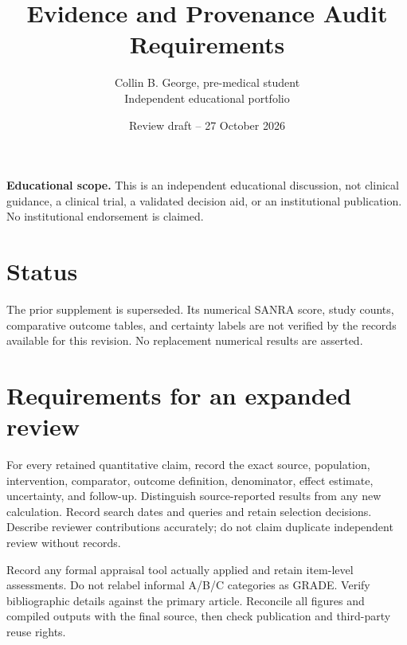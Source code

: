 \documentclass[11pt]{article}
\title{Evidence and Provenance Audit Requirements}
\author{Collin B. George, pre-medical student\\Independent educational portfolio}
\date{Review draft -- 27 October 2026}
\begin{document}
\maketitle
\noindent\textbf{Educational scope.} This is an independent educational discussion, not clinical guidance, a clinical trial, a validated decision aid, or an institutional publication. No institutional endorsement is claimed.

\section{Status}
The prior supplement is superseded. Its numerical SANRA score, study counts, comparative outcome tables, and certainty labels are not verified by the records available for this revision. No replacement numerical results are asserted.
\section{Requirements for an expanded review}
For every retained quantitative claim, record the exact source, population, intervention, comparator, outcome definition, denominator, effect estimate, uncertainty, and follow-up. Distinguish source-reported results from any new calculation. Record search dates and queries and retain selection decisions. Describe reviewer contributions accurately; do not claim duplicate independent review without records.

Record any formal appraisal tool actually applied and retain item-level assessments. Do not relabel informal A/B/C categories as GRADE. Verify bibliographic details against the primary article. Reconcile all figures and compiled outputs with the final source, then check publication and third-party reuse rights.
\end{document}
